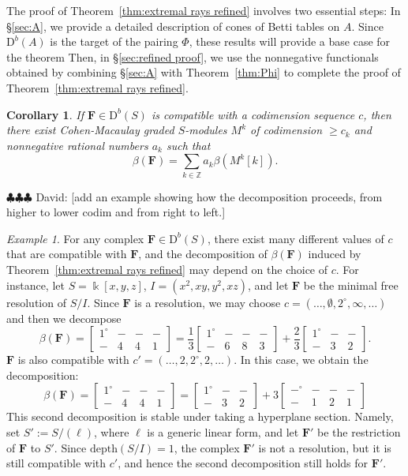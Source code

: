 \documentclass[12pt]{amsart}
\newtheorem{cor}[lemma]{Corollary}
\theoremstyle{definition}
\theoremstyle{remark}
\newtheorem{example}[lemma]{Example}
\newcommand{\kk}{\Bbbk}
\newcommand{\ZZ}{\mathbb{Z}}
\newcommand{\cc}{c}
\newcommand{\FF}{\mathbf{F}}
\newcommand{\zp}{\circ}
\newcommand{\nothing}{\emptyset}
\newcommand{\DD}{\mathrm{D}}
\newcommand{\david}[1]{{\color{red} \sf $\clubsuit\clubsuit\clubsuit$ David: [#1]}}
\begin{document}
The proof of Theorem~\ref{thm:extremal rays refined} involves two essential steps:  In \S\ref{sec:A}, we provide a detailed description of cones of Betti tables on $A$.  Since $\DD^b(A)$ is the target of the pairing $\Phi$, these results will provide a base case for the theorem  Then, in \S\ref{sec:refined proof}, 
we use the nonnegative functionals obtained by combining  \S\ref{sec:A} with Theorem~\ref{thm:Phi} to complete the proof of Theorem~\ref{thm:extremal rays refined}. 

\begin{cor}\label{cor:decompose refined}
If $\FF\in \DD^b(S)$ is compatible with a codimension sequence $\cc$,
then there exist Cohen-Macaulay graded $S$-modules $M^k$ of codimension $\geq \cc_k$ and nonnegative rational numbers $a_k$ such that
\[
\beta(\FF)=\sum_{k\in \ZZ} a_k\beta(M^k[k]).
\]
\end{cor}

\david{add an example showing how the decomposition proceeds, from higher to lower codim and from right to left.}

\begin{example}\label{example:many decompositions}
For any complex $\FF\in \DD^b(S)$, there exist many different values of $\cc$ that are compatible with $\FF$, and the decomposition of $\beta(\FF)$ induced by Theorem~\ref{thm:extremal rays refined} may depend on the choice of $\cc$.   For instance, let $S=\kk[x,y,z]$, $I=(x^2,xy,y^2,xz)$, and let $\FF$ be the minimal free resolution of $S/I$.  Since $\FF$ is a resolution, we may choose $\cc=(\dots, \nothing, 2^\zp, \infty, \dots)$ and then we decompose
\[
\beta(\FF)=\begin{bmatrix}
1^\zp&-&-&-\\
-&4&4&1
\end{bmatrix}
=
\frac{1}{3}
\begin{bmatrix}
1^\zp&-&-&-\\
-&6&8&3
\end{bmatrix}
+\frac{2}{3}
\begin{bmatrix}
1^\zp&-&-\\
-&3&2
\end{bmatrix}.
\]
$\FF$ is also compatible with $\cc'=(\dots, 2, 2^\zp, 2, \dots)$.  In this case, we obtain the decomposition:
\[
\beta(\FF)=
\begin{bmatrix}
1^\zp&-&-&-\\
-&4&4&1
\end{bmatrix}
=\begin{bmatrix}1^\zp&-&-\\-&3&2\end{bmatrix}
+
3\begin{bmatrix}
-^\zp&-&-&-\\
-&1&2&1
\end{bmatrix}
\] 
This second decomposition is stable under taking a hyperplane section.  Namely, set $S':=S/(\ell)$, where $\ell$ is a generic linear form, and let $\FF'$ be the restriction of $\FF$ to $S'$.  Since $\text{depth}(S/I)=1$, the complex $\FF'$ is not a resolution, but it is still compatible with $\cc'$, and hence the second decomposition still holds for $\FF'$.
\end{example}
\end{document}
